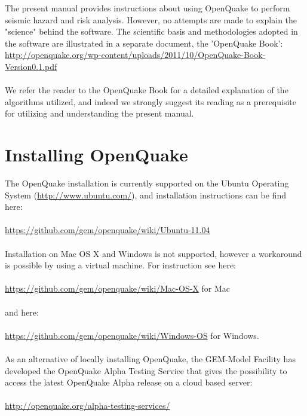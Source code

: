 The present manual provides instructions about using OpenQuake to perform seismic hazard and risk analysis. However, no attempts are made to explain the "science" behind the software. The scientific basis and methodologies adopted in the software are illustrated in a separate document, the 'OpenQuake Book':\\
\href{http://openquake.org/wp-content/uploads/2011/10/OpenQuake-Book_Version0.1.pdf}
   {http://openquake.org/wp-content/uploads/2011/10/OpenQuake-Book-Version0.1.pdf}\\ \\
We refer the reader to the OpenQuake Book for a detailed explanation of the algorithms utilized, and indeed we strongly suggest its reading as a prerequisite for utilizing and understanding the present manual.

\section{Installing OpenQuake}
The OpenQuake installation is currently supported on the Ubuntu Operating System (\href{http://www.ubuntu.com/}
   {http://www.ubuntu.com/}), and installation instructions can be find here:\\ \\
    \href{https://github.com/gem/openquake/wiki/Ubuntu-11.04}
   {https://github.com/gem/openquake/wiki/Ubuntu-11.04}\\ \\
Installation on Mac OS X and Windows is not supported, however a workaround is possible by using a virtual machine. For instruction see here:\\ \\
\href{https://github.com/gem/openquake/wiki/Mac-OS-X}
   {https://github.com/gem/openquake/wiki/Mac-OS-X}   for Mac\\ \\
   and here:\\ \\
   \href{https://github.com/gem/openquake/wiki/Windows-OS}
   {https://github.com/gem/openquake/wiki/Windows-OS} for Windows.\\ \\
As an alternative of locally installing OpenQuake, the GEM-Model Facility has developed the OpenQuake Alpha Testing Service that gives the possibility to access the latest OpenQuake Alpha release on a cloud based server:\\ \\
\href{http://openquake.org/alpha-testing-services/}
   {http://openquake.org/alpha-testing-services/}

